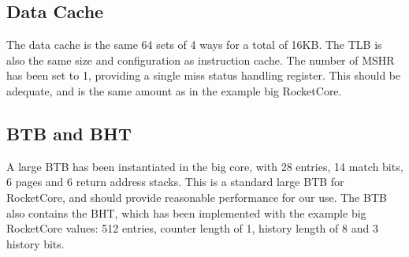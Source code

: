 \subsection{Data Cache}
The data cache is the same 64 sets of 4 ways for a total of 16KB. The TLB is also the same size and configuration as instruction cache. The number of MSHR has been set to 1, providing a single miss status handling register. This should be adequate, and is the same amount as in the example big RocketCore.

\subsection{BTB and BHT}
A large BTB has been instantiated in the big core, with 28 entries, 14 match bits, 6 pages and 6 return address stacks. This is a standard large BTB for RocketCore, and should provide reasonable performance for our use. The BTB also contains the BHT, which has been implemented with the example big RocketCore values: 512 entries, counter length of 1, history length of 8 and 3 history bits.

